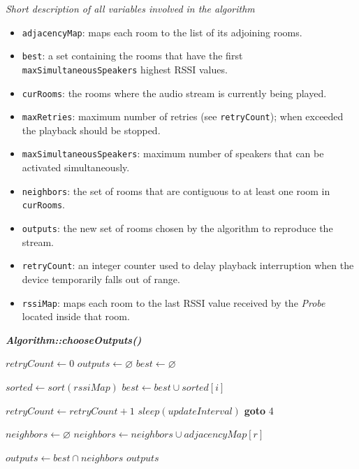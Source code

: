 \documentclass[conference]{IEEEtran}
\begin{document}
\vspace{2mm}
\textit{Short description of all variables involved in the algorithm}
\begin{itemize}
\item \texttt{adjacencyMap}: maps each room to the list of its adjoining rooms.
\item \texttt{best}: a set containing the rooms that have the first \texttt{maxSimultaneousSpeakers} highest RSSI values.
\item \texttt{curRooms}: the rooms where the audio stream is currently being played.
\item \texttt{maxRetries}: maximum number of retries (see \texttt{retryCount}); when exceeded the playback should be stopped.
\item \texttt{maxSimultaneousSpeakers}: maximum number of speakers that can be activated simultaneously.
\item \texttt{neighbors}: the set of rooms that are contiguous to at least one room in \texttt{curRooms}.
\item \texttt{outputs}: the new set of rooms chosen by the algorithm to reproduce the stream.
\item \texttt{retryCount}: an integer counter used to delay playback interruption when the device temporarily falls out of range.
\item \texttt{rssiMap}: maps each room to the last RSSI value received by the \textsl{Probe} located inside that room.
\end{itemize}

\vspace{2mm}
\textbf{\textit{Algorithm::chooseOutputs()}}
\begin{algorithmic}[1]
\STATE $retryCount \gets 0$
\STATE $outputs \gets \varnothing$
\STATE $best \gets \varnothing$

\STATE $sorted \gets sort(rssiMap)$
	\STATE $best \gets best \cup sorted[i]$
\ENDFOR

	\STATE $retryCount \gets retryCount + 1$
	\STATE $sleep(updateInterval)$
	\STATE \textbf{goto} 4
\ENDIF

\STATE $neighbors \gets \varnothing$
	\STATE $neighbors \gets neighbors \cup adjacencyMap[r]$
\ENDFOR

\STATE $outputs \gets best \cap neighbors$
\RETURN $outputs$
\end{algorithmic}
\end{document}
